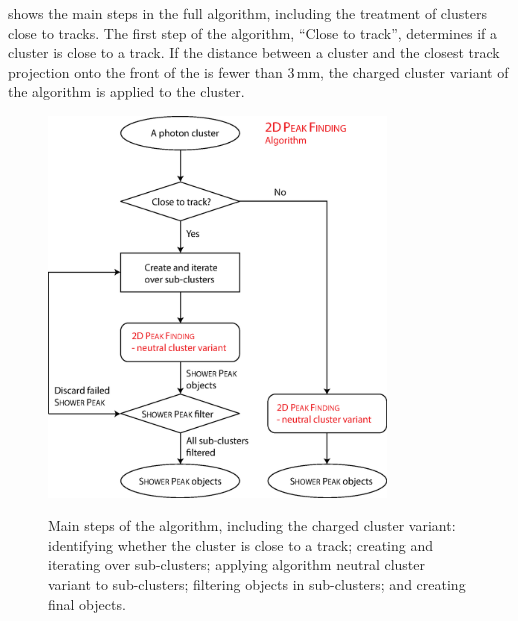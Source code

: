 


 shows the main steps in the full \peakFinding algorithm, including the treatment of clusters close to tracks. The first step of the algorithm, ``Close to track'', determines if a cluster is close to a track. If the distance between a cluster and the closest track projection onto the front of the \ECAL is fewer than 3\,mm, the charged cluster variant of the \peakFinding algorithm is applied to the cluster.

\begin{figure}[tbph]
\centering
{\includegraphics[width=0.8\textwidth]{photon/2DpeakFindingTrack2}}
\caption[Flow chart for \peakFinding algorithm.]
{Main steps of the  \peakFinding algorithm, including the charged cluster variant: identifying whether the cluster is close to a track; creating and iterating over sub-clusters; applying \peakFinding algorithm neutral cluster variant to sub-clusters; filtering \ShowerPeak objects in sub-clusters; and creating final \ShowerPeak objects.}
\label{fig:photonPeakFindingFlow}
\end{figure}


